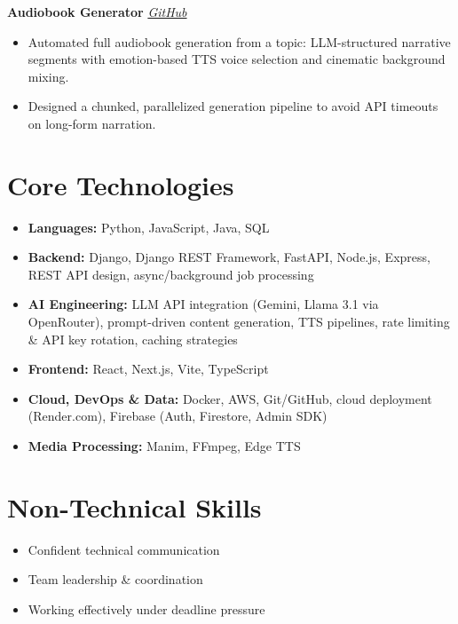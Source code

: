 \documentclass[a4paper,10pt]{article}
\newcommand{\entry}[2]{%
  \noindent\textbf{#1} \hfill \textit{#2}\\[0pt]
}
\begin{document}
\vspace{2pt}

\entry{Audiobook Generator }{\href{https://github.com/Saandeep-Sai/AudioBook_Generator}{GitHub}}
\begin{itemize}[leftmargin=*, itemsep=1pt, topsep=2pt]
\item Automated full audiobook generation from a topic: LLM-structured narrative segments with emotion-based TTS voice selection and cinematic background mixing.
\item Designed a chunked, parallelized generation pipeline to avoid API timeouts on long-form narration.
\end{itemize}

\section{Core Technologies}
\begin{itemize}[leftmargin=*, itemsep=0pt, topsep=1pt]
\item \textbf{Languages:} Python, JavaScript, Java, SQL
\item \textbf{Backend:} Django, Django REST Framework, FastAPI, Node.js, Express, REST API design, async/background job processing
\item \textbf{AI Engineering:} LLM API integration (Gemini, Llama 3.1 via OpenRouter), prompt-driven content generation, TTS pipelines, rate limiting \& API key rotation, caching strategies
\item \textbf{Frontend:} React, Next.js, Vite, TypeScript
\item \textbf{Cloud, DevOps \& Data:} Docker, AWS, Git/GitHub, cloud deployment (Render.com), Firebase (Auth, Firestore, Admin SDK)
\item \textbf{Media Processing:} Manim, FFmpeg, Edge TTS
\end{itemize}

\section{Non-Technical Skills}
\begin{itemize}
\item 
Confident technical communication
\
\item 
Team leadership \& coordination
\
\item Working effectively under deadline pressure
\end{itemize}
\end{document}
